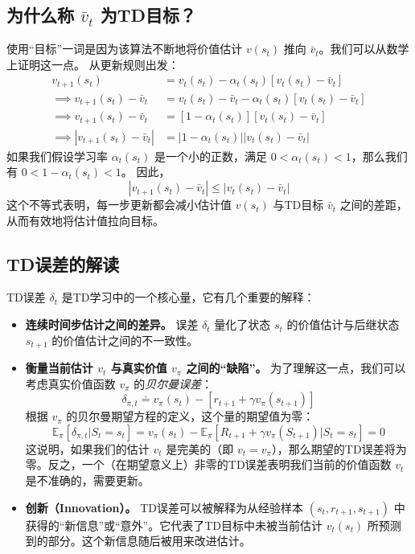 \documentclass[12pt, a4paper]{article}
\begin{document}
\subsection{为什么称 \texorpdfstring{$\bar{v}_t$}{v_bar_t} 为TD目标？}
使用“目标”一词是因为该算法不断地将价值估计 $v(s_t)$ 推向 $\bar{v}_t$。我们可以从数学上证明这一点。
从更新规则出发：
\begin{align*}
v_{t+1}(s_t) &= v_t(s_t) - \alpha_t(s_t) [v_t(s_t) - \bar{v}_t] \\
\implies v_{t+1}(s_t) - \bar{v}_t &= v_t(s_t) - \bar{v}_t - \alpha_t(s_t) [v_t(s_t) - \bar{v}_t] \\
\implies v_{t+1}(s_t) - \bar{v}_t &= [1 - \alpha_t(s_t)] [v_t(s_t) - \bar{v}_t] \\
\implies |v_{t+1}(s_t) - \bar{v}_t| &= |1 - \alpha_t(s_t)| |v_t(s_t) - \bar{v}_t|
\end{align*}
如果我们假设学习率 $\alpha_t(s_t)$ 是一个小的正数，满足 $0 < \alpha_t(s_t) < 1$，那么我们有 $0 < 1 - \alpha_t(s_t) < 1$。
因此，
\[
|v_{t+1}(s_t) - \bar{v}_t| \leq |v_t(s_t) - \bar{v}_t|
\]
这个不等式表明，每一步更新都会减小估计值 $v(s_t)$ 与TD目标 $\bar{v}_t$ 之间的差距，从而有效地将估计值拉向目标。

\subsection{TD误差的解读}
TD误差 $\delta_t$ 是TD学习中的一个核心量，它有几个重要的解释：
\begin{itemize}[leftmargin=*, wide]
    \item \textbf{连续时间步估计之间的差异。} 误差 $\delta_t$ 量化了状态 $s_t$ 的价值估计与后继状态 $s_{t+1}$ 的价值估计之间的不一致性。

    \item \textbf{衡量当前估计 $v_t$ 与真实价值 $v_\pi$ 之间的“缺陷”。} 为了理解这一点，我们可以考虑真实价值函数 $v_\pi$ 的\textit{贝尔曼误差}：
    \[
    \delta_{\pi, t} \doteq v_\pi(s_t) - [r_{t+1} + \gamma v_\pi(s_{t+1})]
    \]
    根据 $v_\pi$ 的贝尔曼期望方程的定义，这个量的期望值为零：
    \[
    \mathbb{E}_\pi[\delta_{\pi, t} | S_t = s_t] = v_\pi(s_t) - \mathbb{E}_\pi[R_{t+1} + \gamma v_\pi(S_{t+1}) | S_t = s_t] = 0
    \]
    这说明，如果我们的估计 $v_t$ 是完美的（即 $v_t = v_\pi$），那么期望的TD误差将为零。反之，一个（在期望意义上）非零的TD误差表明我们当前的价值函数 $v_t$ 是不准确的，需要更新。

    \item \textbf{创新（Innovation）。} TD误差可以被解释为从经验样本 $(s_t, r_{t+1}, s_{t+1})$ 中获得的“新信息”或“意外”。它代表了TD目标中未被当前估计 $v_t(s_t)$ 所预测到的部分。这个新信息随后被用来改进估计。
\end{itemize}
\end{document}
